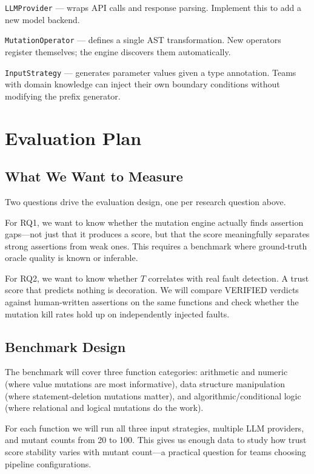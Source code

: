\documentclass[conference]{IEEEtran}
\begin{document}
\texttt{LLMProvider} — wraps API calls and response parsing. Implement this to add a new model backend.

\texttt{MutationOperator} — defines a single AST transformation. New operators register themselves; the engine discovers them automatically.

\texttt{InputStrategy} — generates parameter values given a type annotation. Teams with domain knowledge can inject their own boundary conditions without modifying the prefix generator.

\section{Evaluation Plan}

\subsection{What We Want to Measure}

Two questions drive the evaluation design, one per research question above.

For RQ1, we want to know whether the mutation engine actually finds assertion gaps—not just that it produces a score, but that the score meaningfully separates strong assertions from weak ones. This requires a benchmark where ground-truth oracle quality is known or inferable.

For RQ2, we want to know whether $T$ correlates with real fault detection. A trust score that predicts nothing is decoration. We will compare VERIFIED verdicts against human-written assertions on the same functions and check whether the mutation kill rates hold up on independently injected faults.

\subsection{Benchmark Design}

The benchmark will cover three function categories: arithmetic and numeric (where value mutations are most informative), data structure manipulation (where statement-deletion mutations matter), and algorithmic/conditional logic (where relational and logical mutations do the work).

For each function we will run all three input strategies, multiple LLM providers, and mutant counts from 20 to 100. This gives us enough data to study how trust score stability varies with mutant count—a practical question for teams choosing pipeline configurations.
\end{document}
